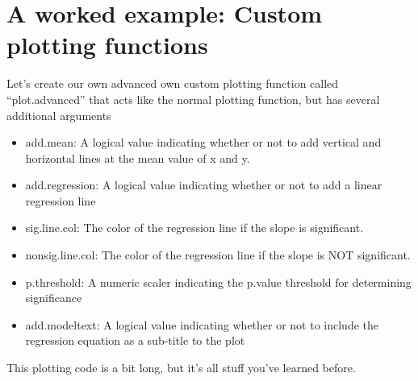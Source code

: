 \documentclass{tufte-book}\usepackage[]{graphicx}\usepackage[]{color}
\begin{document}
\section{A worked example: Custom plotting functions}

Let's create our own advanced own custom plotting function called ``plot.advanced'' that acts like the normal plotting function, but has several additional arguments

\begin{itemize}

  \item add.mean: A logical value indicating whether or not to add vertical and horizontal lines at the mean value of x and y.
  \item add.regression: A logical value indicating whether or not to add a linear regression line
  \item sig.line.col: The color of the regression line if the slope is significant.
  \item nonsig.line.col: The color of the regression line if the slope is NOT significant.
  \item p.threshold: A numeric scaler indicating the p.value threshold for determining significance
  \item add.modeltext: A logical value indicating whether or not to include the regression equation as a sub-title to the plot

\end{itemize}

This plotting code is a bit long, but it's all stuff you've learned before.
\end{document}
